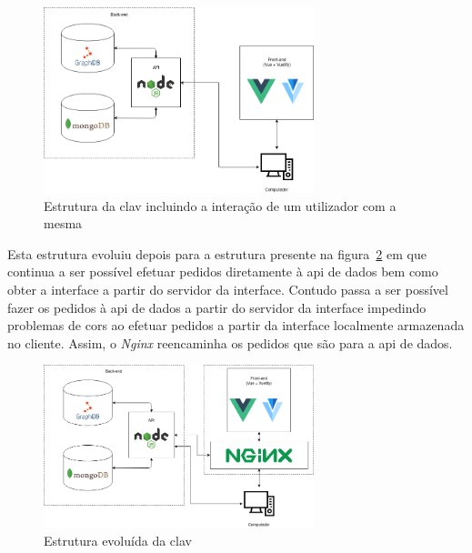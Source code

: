 \begin{figure}[H]
    \begin{center}
        \includegraphics[width=0.7\textwidth]{img/clav_struct.png}
    \end{center}
    \caption{Estrutura da \acrshort{clav} incluindo a interação de um utilizador com a mesma}\label{fig:clav_struct}
\end{figure}

Esta estrutura evoluiu depois para a estrutura presente na figura~\ref{fig:clav_struct2} em que continua a ser possível efetuar pedidos diretamente à \acrshort{api} de dados bem como obter a interface a partir do servidor da interface. Contudo passa a ser possível fazer os pedidos à \acrshort{api} de dados a partir do servidor da interface impedindo problemas de \acrshort{cors} ao efetuar pedidos a partir da interface localmente armazenada no cliente. Assim, o \textit{Nginx} reencaminha os pedidos que são para a \acrshort{api} de dados.

\begin{figure}[H]
    \begin{center}
        \includegraphics[width=0.7\textwidth]{img/clav_struct2.png}
    \end{center}
    \caption{Estrutura evoluída da \acrshort{clav}}\label{fig:clav_struct2}
\end{figure}

